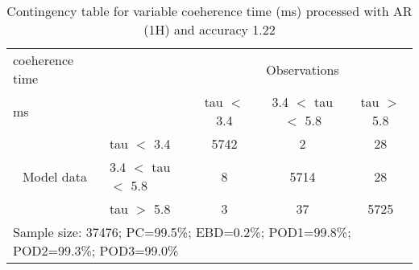 \begin{table}[]
\begin{center}
\begin{tabular}{llccc}
\hline
{coeherence time}                                       &                                                    & \multicolumn{3}{c}{Observations}                 \\
{ms}                                       &                             & tau $<$ 3.4   & 3.4 $<$ tau $<$ 5.8 & tau $>$ 5.8 \\
\hline
\multicolumn{1}{c}{\multirow{3}{*}{Model data}}  & tau $<$ 3.4             & 5742                & 2                       & 28              \\
                                                 & 3.4  $<$ tau $<$ 5.8 & 8                & 5714                       & 28              \\
                                                 & tau $>$ 5.8             & 3                & 37                       & 5725              \\
\hline
\multicolumn{5}{l}{Sample size: 37476; PC=99.5\%; EBD=0.2\%; POD1=99.8\%; POD2=99.3\%; POD3=99.0\%}
\end{tabular}
\end{center}
\caption{Contingency table for variable coeherence time (ms) processed with AR (1H) and accuracy 1.22}
\label{tab:contingencytauAFT}
\end{table}
